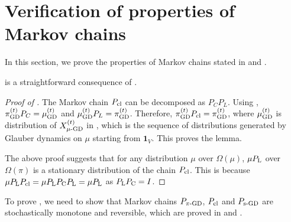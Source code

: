 \documentclass[11pt,a4paper]{article}
\newcommand{\psim}{P_{\textnormal{s-GD}}}
\theoremstyle{definition}
\def\*#1{\mathbf{#1}} %
\begin{document}
    


\section{Verification of properties of Markov chains}\label{sec:proof-comparison-inequality-relation}
In this section, we prove the properties of Markov chains stated in  and .

 is a straightforward consequence of .
\begin{proof}[Proof of ]
The Markov chain $P_{\textnormal{cl}}$ can be decomposed as $P_CP_L$. Using , $\pi^{(t)}_{\textnormal{GD}} P_C = \mu^{(t)}_{\textnormal{GD}}$ and $\mu^{(t)}_{\textnormal{GD}} P_L = \pi^{(t)}_{\textnormal{GD}}$. Therefore, $\pi^{(t)}_{\textnormal{GD}} P_{\textnormal{cl}} = \pi^{(t)}_{\textnormal{GD}}$, where $\mu^{(t)}_{\textnormal{GD}}$ is distribution of $X^{(t)}_{\mu\textnormal{-GD}}$ in , which is the sequence of distributions generated by Glauber dynamics on $\mu$ starting from $\*1_V$. This proves the lemma.

The above proof suggests that for any distribution $\mu$ over $\Omega(\mu)$, $\mu P_{\textnormal{L}}$ over $\Omega(\pi)$ is a stationary distribution of the chain $P_{\textnormal{cl}}$. This is because $\mu P_{\textnormal{L}}P_{\textnormal{cl}} = \mu P_{\textnormal{L}}P_{\textnormal{C}}P_{\textnormal{L}} = \mu P_{\textnormal{L}}$ as $P_{\textnormal{L}}P_{\textnormal{C}} = I$.
\end{proof}




To prove , we need to show that Markov chains $P_{\pi\textnormal{-GD}}$, $P_{\textnormal{cl}}$ and $\psim$ are stochastically monotone and reversible, which are proved in  and .
\end{document}
